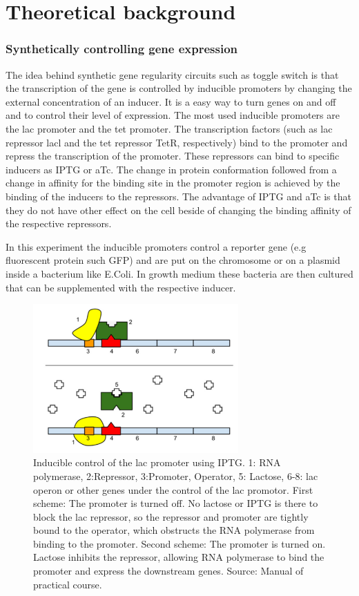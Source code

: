 \documentclass[english,11pt,a4paper]{article}
\begin{document}
\newpage
\part{Theoretical background}

\section{Synthetically controlling gene expression}

The idea behind synthetic gene regularity circuits such as toggle switch is that the transcription of the gene is controlled by inducible promoters by changing the external concentration of an inducer.
It is a easy way to turn genes on and off and to control their level of expression.
The most used inducible promoters are the lac promoter and the tet promoter. 
The transcription factors (such as lac repressor lacl and the tet repressor TetR, respectively) bind to the promoter and repress the transcription of the promoter. 
These repressors can bind to specific inducers as IPTG or aTc. 
The change in protein conformation followed from a change in affinity for the binding site in the promoter region is achieved by the binding of the inducers to the repressors.
The advantage of IPTG and aTc is that they do not have other effect on the cell beside of changing the binding affinity of the respective repressors.

In this experiment the inducible promoters control a reporter gene (e.g fluorescent protein such GFP) and are put on the chromosome or on a plasmid inside a bacterium like E.Coli. 
In growth medium these bacteria are then cultured that can be supplemented with the respective inducer.

\begin{figure}[htbp] 
  \centering
     \includegraphics[width=0.7\textwidth]{IPTG}
  \caption{Inducible control of the lac promoter using IPTG. 1: RNA polymerase, 2:Repressor, 3:Promoter, Operator, 5: Lactose, 6-8: lac operon or other genes under the control of the lac promotor. 
 First scheme: The promoter is turned off. No lactose or IPTG is there to block the lac repressor, so the repressor and promoter are tightly bound to the operator, which obstructs the RNA polymerase from binding to the promoter.
Second scheme: The promoter is turned on. Lactose inhibits the repressor, allowing RNA polymerase to bind the promoter and express the downstream genes. Source: Manual of practical course. }
  \label{fig:Bild1}
\end{figure}
\end{document}
